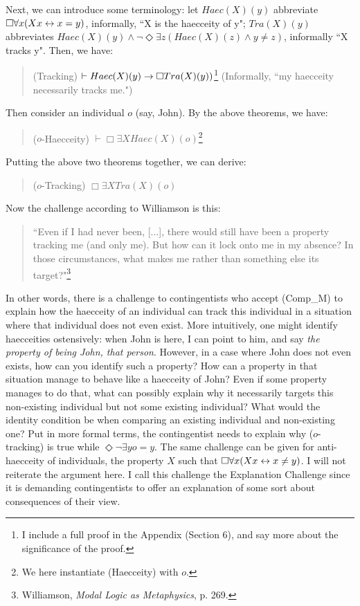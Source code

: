 Next, we can introduce some terminology: let $Haec(X)(y)$ abbreviate $\Box \forall x (Xx \leftrightarrow x=y)$, informally, ``X is the haecceity of y"; $Tra(X)(y)$ abbreviates $Haec(X)(y) \wedge \neg \Diamond \exists z (Haec(X)(z) \wedge y \neq z)$, informally ``X tracks y". Then, we have: 
\begin{quote}
(Tracking) $\vdash Haec(X)(y) \rightarrow \Box Tra(X)(y))$\footnote{I include a full proof in the Appendix (Section 6), and say more about the significance of the proof.}
(Informally, ``my haecceity necessarily tracks me.") 
\end{quote}
Then consider an individual $o$ (say, John). By the above theorems, we have: 
\begin{quote}
($o$-Haecceity) $\vdash \Box \exists X Haec(X)(o)$\footnote{We here instantiate (Haecceity) with $o$.}
\end{quote}
Putting the above two theorems together, we can derive: 
\begin{quote}
($o$-Tracking) $\Box \exists X Tra(X)(o)$
\end{quote}
Now the challenge according to Williamson is this: 
\begin{quote}
``Even if I had never been, [...], there would still have been a property tracking me (and only me). But how can it lock onto me in my absence? In those circumstances, what makes me rather than something else its target?"\footnote{Williamson, \textit{Modal Logic as Metaphysics}, p. 269.}
\end{quote}
In other words, there is a challenge to contingentists who accept (Comp_M) to explain how the haecceity of an individual can track this individual in a situation where that individual does not even exist. More intuitively, one might identify haecceities ostensively: when John is here, I can point to him, and say \textit{the property of being John, that person}. However, in a case where John does not even exists, how can you identify such a property? How can a property in that situation manage to behave like a haecceity of John? Even if some property manages to do that, what can possibly explain why it necessarily targets this non-existing individual but not some existing individual? What would the identity condition be when comparing an existing individual and non-existing one?  
Put in more formal terms, the contingentist needs to explain why ($o$-tracking) is true while $\Diamond \neg \exists y o=y$. 
The same challenge can be given for anti-haecceity of individuals, the property $X$ such that $\Box \forall x (Xx \leftrightarrow x \neq y)$. I will not reiterate the argument here. I call this challenge the Explanation Challenge since it is demanding contingentists to offer an explanation of some sort about consequences of their view. 


